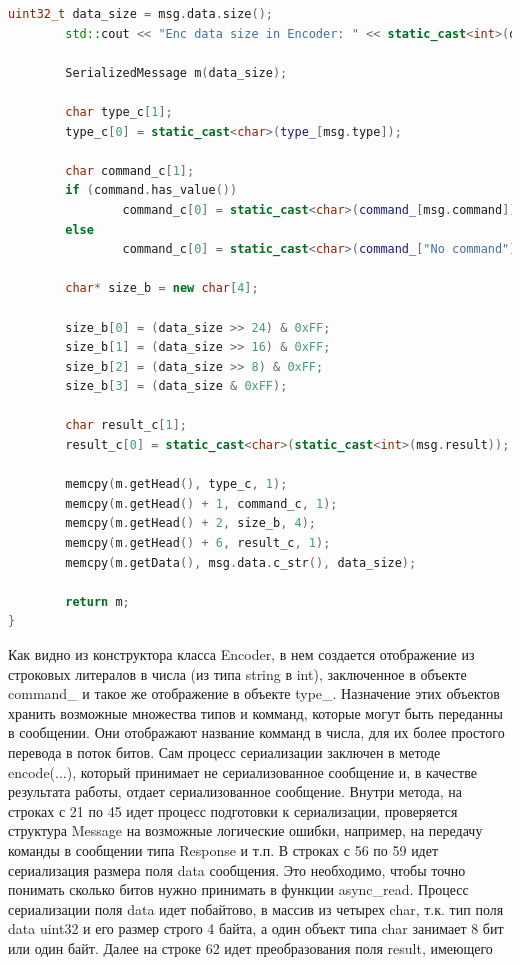 \documentclass[a4paper, 14pt]{extreport}
\begin{document}
\begin{lstlisting}[language=C++, frame=single, xleftmargin=15pt, caption={Определение методов класса Encoder},label=DescriptiveLabel]
        uint32_t data_size = msg.data.size();
        std::cout << "Enc data size in Encoder: " << static_cast<int>(data_size) << std::endl;

        SerializedMessage m(data_size);

        char type_c[1];
        type_c[0] = static_cast<char>(type_[msg.type]);

        char command_c[1];
        if (command.has_value())
                command_c[0] = static_cast<char>(command_[msg.command]);
        else
                command_c[0] = static_cast<char>(command_["No command"]);

        char* size_b = new char[4];

        size_b[0] = (data_size >> 24) & 0xFF;
        size_b[1] = (data_size >> 16) & 0xFF;
        size_b[2] = (data_size >> 8) & 0xFF;
        size_b[3] = (data_size & 0xFF);

        char result_c[1];
        result_c[0] = static_cast<char>(static_cast<int>(msg.result));

        memcpy(m.getHead(), type_c, 1);
        memcpy(m.getHead() + 1, command_c, 1);
        memcpy(m.getHead() + 2, size_b, 4);
        memcpy(m.getHead() + 6, result_c, 1);
        memcpy(m.getData(), msg.data.c_str(), data_size);

        return m;
}
\end{lstlisting}
\par Как видно из конструктора класса Encoder, в нем создается отображение из строковых литералов в числа (из типа string в int), 
заключенное в объекте command\_ и такое же отображение в объекте type\_. Назначение этих объектов хранить возможные множества типов 
и комманд, которые могут быть переданны в сообщении. Они отображают название комманд в числа, для их более простого перевода в 
поток битов. Сам процесс сериализации заключен в методе encode(...), который принимает не сериализованное сообщение и, в качестве 
результата работы, отдает сериализованное сообщение. Внутри метода, на строках с 21 по 45 идет процесс подготовки к сериализации, 
проверяется структура Message на возможные логические ошибки, например, на передачу команды в сообщении типа Response и т.п. В строках 
с 56 по 59 идет сериализация размера поля data сообщения. Это необходимо, чтобы точно понимать сколько битов нужно принимать в 
функции async\_read. Процесс сериализации поля data идет побайтово, в массив из четырех char, т.к. тип поля data uint32 и его размер 
строго 4 байта, а один объект типа char занимает 8 бит или один байт. Далее на строке 62 идет преобразования поля result, имеющего 
\end{document}
